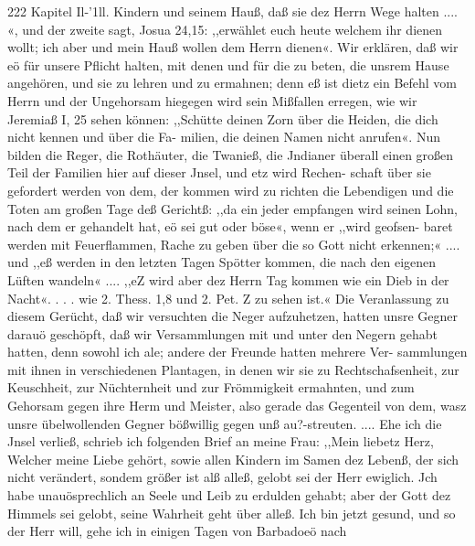 222 Kapitel Il-’1ll.
Kindern und seinem Hauß, daß sie dez Herrn Wege halten .... «,
und der zweite sagt, Josua 24,15: ,,erwählet euch heute welchem
ihr dienen wollt; ich aber und mein Hauß wollen dem Herrn
dienen«. Wir erklären, daß wir eö für unsere Pflicht halten,
mit denen und für die zu beten, die unsrem Hause angehören,
und sie zu lehren und zu ermahnen; denn eß ist dietz ein Befehl
vom Herrn und der Ungehorsam hiegegen wird sein Mißfallen
erregen, wie wir Jeremiaß I, 25 sehen können: ,,Schütte deinen
Zorn über die Heiden, die dich nicht kennen und über die Fa-
milien, die deinen Namen nicht anrufen«. Nun bilden die
Reger, die Rothäuter, die Twanieß, die Jndianer überall einen
großen Teil der Familien hier auf dieser Jnsel, und etz wird Rechen-
schaft über sie gefordert werden von dem, der kommen wird zu
richten die Lebendigen und die Toten am großen Tage deß
Gerichtß: ,,da ein jeder empfangen wird seinen Lohn, nach dem
er gehandelt hat, eö sei gut oder böse«, wenn er ,,wird geofsen-
baret werden mit Feuerflammen, Rache zu geben über die so
Gott nicht erkennen;« .... und ,,eß werden in den letzten Tagen
Spötter kommen, die nach den eigenen Lüften wandeln« .... ,,eZ
wird aber dez Herrn Tag kommen wie ein Dieb in der Nacht«. . . .
wie 2. Thess. 1,8 und 2. Pet. Z zu sehen ist.«
Die Veranlassung zu diesem Gerücht, daß wir versuchten die
Neger aufzuhetzen, hatten unsre Gegner darauö geschöpft, daß
wir Versammlungen mit und unter den Negern gehabt hatten,
denn sowohl ich ale; andere der Freunde hatten mehrere Ver-
sammlungen mit ihnen in verschiedenen Plantagen, in denen wir
sie zu Rechtschafsenheit, zur Keuschheit, zur Nüchternheit und zur
Frömmigkeit ermahnten, und zum Gehorsam gegen ihre Herm
und Meister, also gerade das Gegenteil von dem, wasz unsre
übelwollenden Gegner bößwillig gegen unß au?-streuten. ....
Ehe ich die Jnsel verließ, schrieb ich folgenden Brief an
meine Frau:
,,Mein liebetz Herz,
Welcher meine Liebe gehört, sowie allen Kindern im Samen
dez Lebenß, der sich nicht verändert, sondem größer ist alß alleß,
gelobt sei der Herr ewiglich. Jch habe unauösprechlich an Seele
und Leib zu erdulden gehabt; aber der Gott dez Himmels sei
gelobt, seine Wahrheit geht über alleß. Ich bin jetzt gesund, und
so der Herr will, gehe ich in einigen Tagen von Barbadoeö nach


